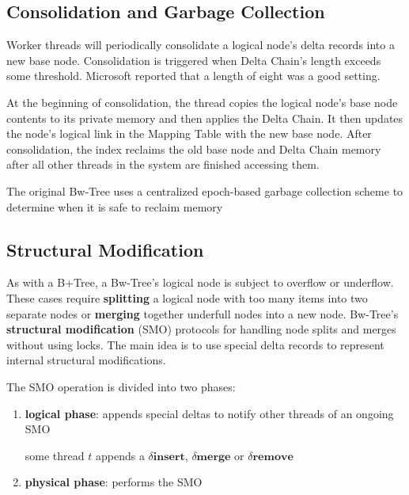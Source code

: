 \documentclass[11pt]{article}
\def \dinsert{\delta\textbf{insert}}
\def \dmerge {\delta\textbf{merge}}
\def \dremove{\delta\textbf{remove}}
\begin{document}
\subsection{Consolidation and Garbage Collection}
\label{sec:org329a132}
Worker threads will periodically consolidate a logical node’s delta records into a new base node.
Consolidation is triggered when Delta Chain’s length exceeds some threshold. Microsoft reported that a
length of eight was a good setting.

At the beginning of consolidation, the thread copies the logical node’s base node contents to its
private memory and then applies the Delta Chain. It then updates the node’s logical link in the
Mapping Table with the new base node. After consolidation, the index reclaims the old base node and
Delta Chain memory after all other threads in the system are finished accessing them.

The original Bw-Tree uses a centralized epoch-based garbage collection scheme to determine when it is
safe to reclaim memory
\subsection{Structural Modification}
\label{sec:org1552117}
As with a B+Tree, a Bw-Tree’s logical node is subject to overflow or underflow. These cases require
\textbf{splitting} a logical node with too many items into two separate nodes or \textbf{merging} together underfull
nodes into a new node. Bw-Tree’s \textbf{structural modification} (SMO) protocols for handling node splits and
merges without using locks. The main idea is to use special delta records to represent internal
structural modifications.

The SMO operation is divided into two phases:
\begin{enumerate}
\item \textbf{logical phase}: appends special deltas to notify other threads of an ongoing SMO

some thread \(t\) appends a \(\dinsert\), \(\dmerge\) or \(\dremove\)

\item \textbf{physical phase}: performs the SMO
\end{enumerate}
\end{document}
